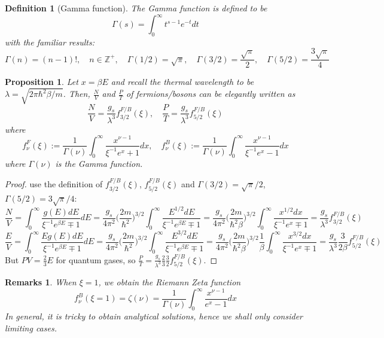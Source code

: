 \documentclass[a4paper]{article}
\newtheorem{remarks}{Remarks}[section]
\theoremstyle{new}
\newtheorem{defi}{Definition}[section]
\newtheorem{prop}{Proposition}[section]
\begin{document}
\begin{defi}[Gamma function]
The Gamma function is defined to be
$$\Gamma(s)=\int_0^\infty t^{s-1}e^{-t}dt$$
with the familiar results:
$$\Gamma(n)=(n-1)!,\quad n\in\mathbb{Z}^+,\quad\Gamma(1/2)=\sqrt{\pi},\quad\Gamma(3/2)=\frac{\sqrt{\pi}}{2},\quad\Gamma(5/2)=\frac{3\sqrt{\pi}}{4}$$
\end{defi}
\begin{prop}
Let $x=\beta E$ and recall the thermal wavelength to be $\lambda=\sqrt{2\pi\hbar^2\beta/m}$. Then, $\frac{N}{V}$ and $\frac{P}{T}$ of fermions/bosons can be elegantly written as
$$\frac{N}{V}=\frac{g_s}{\lambda^3}f_{3/2}^{F/B}(\xi),\quad\frac{P}{T}=\frac{g_s}{\lambda^3}f_{5/2}^{F/B}(\xi)$$
where
$$f_\nu^F(\xi):=\frac{1}{\Gamma(\nu)}\int_0^\infty\frac{x^{\nu-1}}{\xi^{-1}e^x+1}dx,\quad f_\nu^B(\xi):=\frac{1}{\Gamma(\nu)}\int_0^\infty\frac{x^{\nu-1}}{\xi^{-1}e^x-1}dx$$
where $\Gamma(\nu)$ is the Gamma function.
\end{prop}
\begin{proof}
use the definition of $f_{3/2}^{F/B}(\xi)$, $f_{5/2}^{F/B}(\xi)$ and $\Gamma(3/2)=\sqrt{\pi}/2$, $\Gamma(5/2)=3\sqrt{\pi}/4$:
$$\frac{N}{V}=\int_0^\infty\frac{g(E)dE}{\xi^{-1}e^{\beta E}\mp 1}dE=\frac{g_s}{4\pi^2}\bigg(\frac{2m}{\hbar^2}\bigg)^{3/2}\int_0^\infty\frac{E^{1/2}dE}{\xi^{-1}e^{\beta E}\mp 1}=\frac{g_s}{4\pi^2}\bigg(\frac{2m}{\hbar^2\beta}\bigg)^{3/2}\int_0^\infty\frac{x^{1/2}dx}{\xi^{-1}e^x\mp 1}=\frac{g_s}{\lambda^3}f_{3/2}^{F/B}(\xi)$$
$$\frac{E}{V}=\int_0^\infty\frac{Eg(E)dE}{\xi^{-1}e^{\beta E}\mp 1}dE=\frac{g_s}{4\pi^2}\bigg(\frac{2m}{\hbar^2}\bigg)^{3/2}\int_0^\infty\frac{E^{3/2}dE}{\xi^{-1}e^{\beta E}\mp 1}=\frac{g_s}{4\pi^2}\bigg(\frac{2m}{\hbar^2\beta}\bigg)^{3/2}\frac{1}{\beta}\int_0^\infty\frac{x^{3/2}dx}{\xi^{-1}e^x\mp 1}=\frac{g_s}{\lambda^3}\frac{3}{2\beta}f_{5/2}^{F/B}(\xi)$$
But $PV=\frac{2}{3}E$ for quantum gases, so $\frac{P}{T}=\frac{g_s}{\lambda^3}\frac{2}{3}\frac{3}{2}f_{5/2}^{F/B}(\xi)$.
\end{proof}
\begin{remarks}
When $\xi=1$, we obtain the Riemann Zeta function
$$f_\nu^B(\xi=1)=\zeta(\nu)=\frac{1}{\Gamma(\nu)}\int_0^\infty\frac{x^{\nu-1}}{e^x-1}dx$$
In general, it is tricky to obtain analytical solutions, hence we shall only consider limiting cases.
\end{remarks}
\newpage
\end{document}
